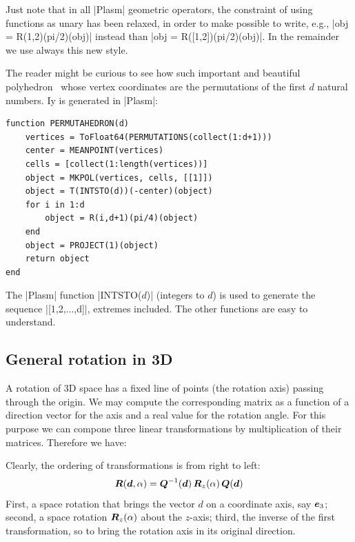 \begin{remark}
Just note that in all |Plasm| geometric operators, the constraint of using functions as unary has been relaxed, in order to make possible to write, e.g., |obj = R(1,2)(pi/2)(obj)| instead than |obj = R([1,2])(pi/2)(obj)|. In the remainder we use always this new style.
\end{remark}


\begin{coding}[Permutahedron]\label{4-2-permutaheron}
The reader might be curious to see how such important and beautiful polyhedron~\cite{wiki:pao:100} whose vertex coordinates are the permutations of the first $d$ natural numbers. Iy is generated in |Plasm|:
\begin{lstlisting}[language=JuliaLocal, style=julia, mathescape=true]
function PERMUTAHEDRON(d)
	vertices = ToFloat64(PERMUTATIONS(collect(1:d+1)))
	center = MEANPOINT(vertices)
	cells = [collect(1:length(vertices))]
	object = MKPOL(vertices, cells, [[1]])
	object = T(INTSTO(d))(-center)(object)
	for i in 1:d
		object = R(i,d+1)(pi/4)(object)
	end
	object = PROJECT(1)(object)
	return object
end
\end{lstlisting}
The |Plasm| function |INTSTO($d$)| (integers to $d$) is used to generate the sequence |[1,2,$\ldots$,d]|, extremes included. The other functions are easy to understand.
\end{coding}




\subsection*{General rotation in 3D}

A rotation of 3D space has a fixed line of points (the rotation axis) passing through the origin. We may compute the corresponding matrix as a function of a direction vector for the axis and a real value for the rotation angle. For this purpose we can compone three linear transformations by multiplication of their matrices.  Therefore we have:

\begin{definition}
Clearly, the ordering of transformations is from right to left:
\[
{\mbox{\boldmath $R$}}({\mbox{\boldmath $d$}},\alpha) = {\mbox{\boldmath $Q$}}^{-1}({\mbox{\boldmath $d$}})\, {\mbox{\boldmath $R$}}_z(\alpha)\, {\mbox{\boldmath $Q$}}({\mbox{\boldmath $d$}})
\]
First, a space rotation that brings the vector $d$ on a coordinate axis, say ${\mbox{\boldmath $e$}}_3$; second, a space rotation ${\mbox{\boldmath $R$}}_z(\alpha)$ about the $z$-axis; third, the inverse of the first transformation, so to bring the rotation axis in its original direction.
\end{definition}


